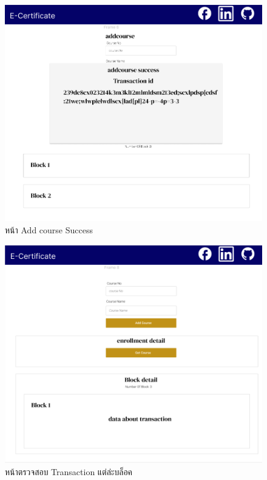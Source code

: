 \graphicspath{ {./images/} }
\begin{figure}[htbp]
  \centering 
  \includegraphics[scale=0.5]{addss.png}
  \caption[หน้า Add course Success]{หน้า Add course Success}
  \label{fig:add success}
\end{figure}

\graphicspath{ {./images/} }
\begin{figure}[htbp]
  \centering 
  \includegraphics[scale=0.5]{blocktr.png}
  \caption[หน้าตรวจสอบ Transaction แต่ล่ะบล็อค]{หน้าตรวจสอบ Transaction แต่ล่ะบล็อค}
  \label{fig:block}
\end{figure}


